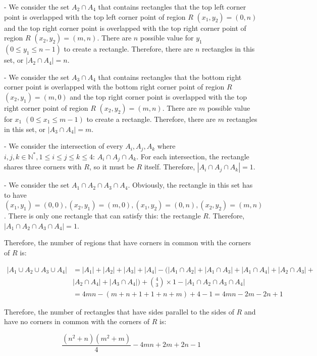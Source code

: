 \documentclass[10pt]{article}
\begin{document}
\begin{enumerate}
\begin{enumerate}
- We consider the set $A_2 \cap A_4$ that contains rectangles that the top left corner point is overlapped with the top left corner point of region $R$ $(x_1,y_2)=(0,n)$ and the top right corner point is overlapped with the top right corner point of region $R$ $(x_2,y_2)=(m,n)$. There are $n$ possible value for $y_1$ $(0 \leq y_1 \leq n-1)$ to create a rectangle. Therefore, there are $n$ rectangles in this set, or $|A_2 \cap A_4| = n$.


- We consider the set $A_3 \cap A_4$ that contains rectangles that the bottom right corner point is overlapped with the bottom right corner point of region $R$ $(x_2,y_1)=(m,0)$ and the top right corner point is overlapped with the top right corner point of region $R$ $(x_2,y_2)=(m,n)$. There are $m$ possible value for $x_1$ $(0 \leq x_1 \leq m-1)$ to create a rectangle. Therefore, there are $m$ rectangles in this set, or $|A_3 \cap A_4| = m$.

- We consider the intersection of every $A_i, A_j, A_k$ where $i,j,k \in \mathbb{N}^*, 1 \leq i \leq j \leq k \leq 4$: $A_i \cap A_j \cap A_k$. For each intersection, the rectangle shares three corners with $R$, so it must be $R$ itself. Therefore, $|A_i \cap A_j \cap A_k| = 1$.

- We consider the set $A_1 \cap A_2 \cap A_3 \cap A_4$. Obviously, the rectangle in this set has to have $(x_1,y_1)=(0,0), (x_2,y_1)=(m, 0), (x_1,y_2)=(0, n), (x_2,y_2)=(m, n)$. There is only one rectangle that can satisfy this: the rectangle $R$. Therefore, $|A_1 \cap A_2 \cap A_3 \cap A_4| = 1$.


Therefore, the number of regions that have corners in common with the corners of $R$ is:

\begin{align*}
    |A_1 \cup A_2 \cup A_3 \cup A_4|&=|A_1|+|A_2|+|A_3|+|A_4| - (|A_1 \cap A_2|+|A_1 \cap A_3|+|A_1 \cap A_4|+|A_2 \cap A_3|+\\&|A_2 \cap A_4|+|A_3 \cap A_4|) + \binom{4}{3} \times 1 - |A_1 \cap A_2 \cap A_3 \cap A_4|\\
    &= 4mn - (m+n+1+1+n+m) + 4 - 1 = 4mn -2m -2n +1
\end{align*}

Therefore, the number of rectangles that have sides parallel to the sides of $R$ and have no corners in common with the corners of $R$ is:

$$\frac{(n^2+n)(m^2+m)}{4} - 4mn + 2m + 2n -1$$

\end{enumerate}


\end{enumerate}
\end{document}
